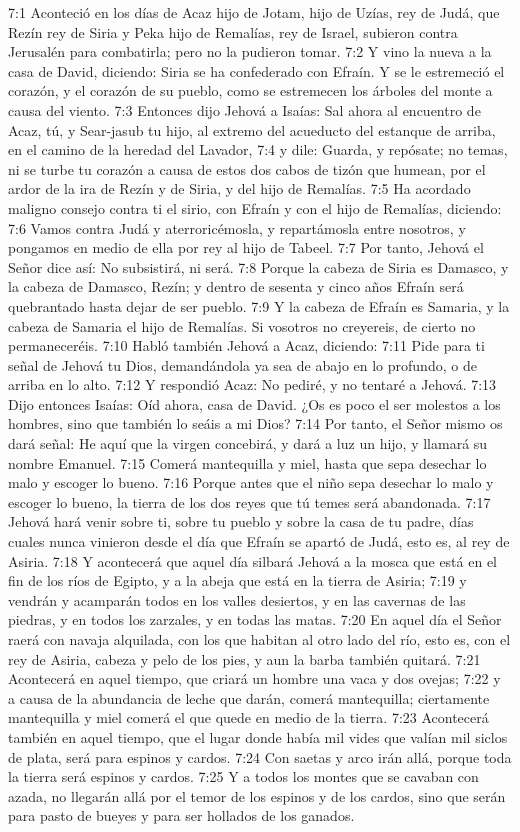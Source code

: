 7:1 Aconteció en los días de Acaz hijo de Jotam, hijo de Uzías, rey de Judá, que Rezín rey de Siria y Peka hijo de Remalías, rey de Israel, subieron contra Jerusalén para combatirla; pero no la pudieron tomar. 
7:2 Y vino la nueva a la casa de David, diciendo: Siria se ha confederado con Efraín. Y se le estremeció el corazón, y el corazón de su pueblo, como se estremecen los árboles del monte a causa del viento. 
7:3 Entonces dijo Jehová a Isaías: Sal ahora al encuentro de Acaz, tú, y Sear-jasub tu hijo, al extremo del acueducto del estanque de arriba, en el camino de la heredad del Lavador, 
7:4 y dile: Guarda, y repósate; no temas, ni se turbe tu corazón a causa de estos dos cabos de tizón que humean, por el ardor de la ira de Rezín y de Siria, y del hijo de Remalías. 
7:5 Ha acordado maligno consejo contra ti el sirio, con Efraín y con el hijo de Remalías, diciendo: 
7:6 Vamos contra Judá y aterroricémosla, y repartámosla entre nosotros, y pongamos en medio de ella por rey al hijo de Tabeel. 
7:7 Por tanto, Jehová el Señor dice así: No subsistirá, ni será. 
7:8 Porque la cabeza de Siria es Damasco, y la cabeza de Damasco, Rezín; y dentro de sesenta y cinco años Efraín será quebrantado hasta dejar de ser pueblo. 
7:9 Y la cabeza de Efraín es Samaria, y la cabeza de Samaria el hijo de Remalías. Si vosotros no creyereis, de cierto no permaneceréis. 
7:10 Habló también Jehová a Acaz, diciendo: 
7:11 Pide para ti señal de Jehová tu Dios, demandándola ya sea de abajo en lo profundo, o de arriba en lo alto. 
7:12 Y respondió Acaz: No pediré, y no tentaré a Jehová. 
7:13 Dijo entonces Isaías: Oíd ahora, casa de David. ¿Os es poco el ser molestos a los hombres, sino que también lo seáis a mi Dios? 
7:14 Por tanto, el Señor mismo os dará señal: He aquí que la virgen concebirá, y dará a luz un hijo, y llamará su nombre Emanuel. 
7:15 Comerá mantequilla y miel, hasta que sepa desechar lo malo y escoger lo bueno. 
7:16 Porque antes que el niño sepa desechar lo malo y escoger lo bueno, la tierra de los dos reyes que tú temes será abandonada. 
7:17 Jehová hará venir sobre ti, sobre tu pueblo y sobre la casa de tu padre, días cuales nunca vinieron desde el día que Efraín se apartó de Judá, esto es, al rey de Asiria. 
7:18 Y acontecerá que aquel día silbará Jehová a la mosca que está en el fin de los ríos de Egipto, y a la abeja que está en la tierra de Asiria; 
7:19 y vendrán y acamparán todos en los valles desiertos, y en las cavernas de las piedras, y en todos los zarzales, y en todas las matas. 
7:20 En aquel día el Señor raerá con navaja alquilada, con los que habitan al otro lado del río, esto es, con el rey de Asiria, cabeza y pelo de los pies, y aun la barba también quitará. 
7:21 Acontecerá en aquel tiempo, que criará un hombre una vaca y dos ovejas; 
7:22 y a causa de la abundancia de leche que darán, comerá mantequilla; ciertamente mantequilla y miel comerá el que quede en medio de la tierra. 
7:23 Acontecerá también en aquel tiempo, que el lugar donde había mil vides que valían mil siclos de plata, será para espinos y cardos. 
7:24 Con saetas y arco irán allá, porque toda la tierra será espinos y cardos. 
7:25 Y a todos los montes que se cavaban con azada, no llegarán allá por el temor de los espinos y de los cardos, sino que serán para pasto de bueyes y para ser hollados de los ganados. 
